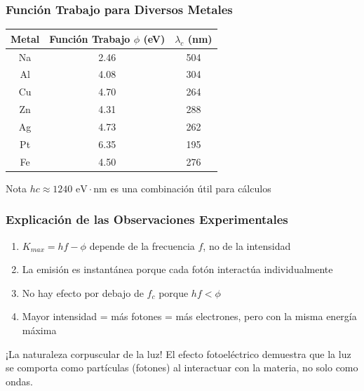 \documentclass{beamer}
\begin{document}
	\begin{frame}
		\frametitle{Función Trabajo para Diversos Metales}
		\begin{center}
			\begin{tabular}{|c|c|c|}
				\hline
				\textbf{Metal} & \textbf{Función Trabajo $\phi$ (eV)} & \textbf{$\lambda_c$ (nm)}\\
				\hline
				Na & 2.46 & 504 \\
				Al & 4.08 & 304 \\
				Cu & 4.70 & 264 \\
				Zn & 4.31 & 288 \\
				Ag & 4.73 & 262 \\
				Pt & 6.35 & 195 \\
				Fe & 4.50 & 276 \\
				\hline
			\end{tabular}
		\end{center}
		
		\begin{block}{Nota}
			$hc \approx 1240 \text{ eV} \cdot \text{nm}$ es una combinación útil para cálculos
		\end{block}
	\end{frame}
	
	\begin{frame}
		\frametitle{Explicación de las Observaciones Experimentales}
		\begin{enumerate}
			\item $K_{max} = hf - \phi$ depende de la frecuencia $f$, no de la intensidad
			\item La emisión es instantánea porque cada fotón interactúa individualmente
			\item No hay efecto por debajo de $f_c$ porque $hf < \phi$
			\item Mayor intensidad = más fotones = más electrones, pero con la misma energía máxima
		\end{enumerate}
		
		\begin{alertblock}{¡La naturaleza corpuscular de la luz!}
			El efecto fotoeléctrico demuestra que la luz se comporta como partículas (fotones) al interactuar con la materia, no solo como ondas.
		\end{alertblock}
	\end{frame}
	
\end{document}
